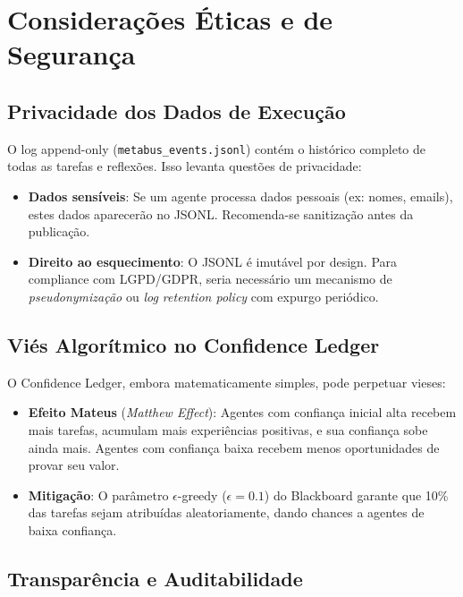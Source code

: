 \section{Considerações Éticas e de Segurança}
\label{sec:ethics}

\subsection{Privacidade dos Dados de Execução}

O log append-only (\texttt{metabus\_events.jsonl}) contém o histórico completo de todas as tarefas e reflexões. Isso levanta questões de privacidade:

\begin{itemize}
    \item \textbf{Dados sensíveis}: Se um agente processa dados pessoais (ex: nomes, emails), estes dados aparecerão no JSONL. Recomenda-se sanitização antes da publicação.
    \item \textbf{Direito ao esquecimento}: O JSONL é imutável por design. Para compliance com LGPD/GDPR, seria necessário um mecanismo de \textit{pseudonymização} ou \textit{log retention policy} com expurgo periódico.
\end{itemize}

\subsection{Viés Algorítmico no Confidence Ledger}

O Confidence Ledger, embora matematicamente simples, pode perpetuar vieses:

\begin{itemize}
    \item \textbf{Efeito Mateus} (\textit{Matthew Effect}): Agentes com confiança inicial alta recebem mais tarefas, acumulam mais experiências positivas, e sua confiança sobe ainda mais. Agentes com confiança baixa recebem menos oportunidades de provar seu valor.
    \item \textbf{Mitigação}: O parâmetro $\epsilon$-greedy ($\epsilon = 0.1$) do Blackboard garante que 10\% das tarefas sejam atribuídas aleatoriamente, dando chances a agentes de baixa confiança.
\end{itemize}

\subsection{Transparência e Auditabilidade}

